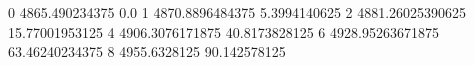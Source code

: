 0 4865.490234375 0.0
1 4870.8896484375 5.3994140625
2 4881.26025390625 15.77001953125
4 4906.3076171875 40.8173828125
6 4928.95263671875 63.46240234375
8 4955.6328125 90.142578125
